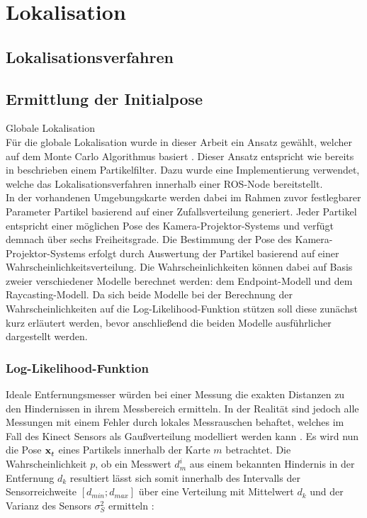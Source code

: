 \chapter{Lokalisation}


\section{Lokalisationsverfahren}

\section{Ermittlung der Initialpose}
\label{chap.globloc}
Globale Lokalisation\\
Für die globale Lokalisation wurde in dieser Arbeit ein Ansatz gewählt, welcher auf dem Monte Carlo Algorithmus basiert \cite{Dellaert1999}. Dieser Ansatz entspricht wie bereits in  beschrieben einem Partikelfilter. Dazu wurde eine Implementierung \cite{humanoidNavigation} verwendet, welche das Lokalisationsverfahren innerhalb einer ROS-Node bereitstellt. \\
In der vorhandenen Umgebungskarte werden dabei im Rahmen zuvor festlegbarer Parameter Partikel basierend auf einer Zufallsverteilung generiert. Jeder Partikel entspricht einer möglichen Pose des Kamera-Projektor-Systems und verfügt demnach über sechs Freiheitsgrade. Die Bestimmung der Pose des Kamera-Projektor-Systems erfolgt durch Auswertung der Partikel basierend auf einer Wahrscheinlichkeitsverteilung. Die Wahrscheinlichkeiten können dabei auf Basis zweier verschiedener Modelle berechnet werden: dem Endpoint-Modell und dem Raycasting-Modell. Da sich beide Modelle bei der Berechnung der Wahrscheinlichkeiten auf die Log-Likelihood-Funktion stützen soll diese zunächst kurz erläutert werden, bevor anschließend die beiden Modelle ausführlicher dargestellt werden.

\subsection{Log-Likelihood-Funktion}
\label{chap.loglik}
Ideale Entfernungsmesser würden bei einer Messung die exakten Distanzen zu den Hindernissen in ihrem Messbereich ermitteln. In der Realität sind jedoch alle Messungen mit einem Fehler durch lokales Messrauschen behaftet, welches im Fall des Kinect Sensors als Gaußverteilung modelliert werden kann \cite{Nguyen2012}. Es wird nun die Pose $\mathbf{x}^{}_{t}$ eines Partikels innerhalb der Karte $m$ betrachtet. Die Wahrscheinlichkeit $p$, ob ein Messwert $d_m^i$ aus einem bekannten Hindernis in der Entfernung $d_k$ resultiert lässt sich somit innerhalb des Intervalls der Sensorreichweite $[d_{min};d_{max}]$ über eine Verteilung mit Mittelwert $d_k$ und der Varianz des Sensors $\sigma_{S}^2$ ermitteln \cite{Thrun2005}:

